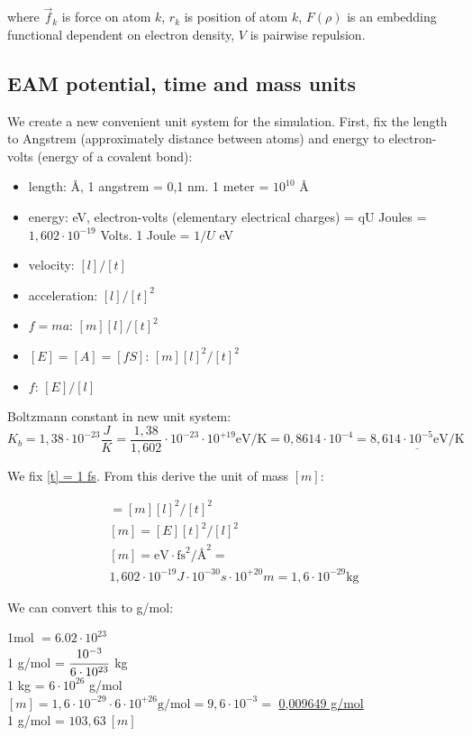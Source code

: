 \documentclass[12pt,a4paper]{article}
\newcommand{\mat}[1]{\vec{#1}}
\begin{document}
where $\mat{f}_k$ is force on atom $k$, $r_k$ is position of atom $k$, $F(\rho)$ is an embedding functional dependent on electron density, $V$ is pairwise repulsion.

\subsection*{EAM potential, time and mass units}

We create a new convenient unit system for the simulation. First, fix the length to Angstrem (approximately distance between atoms) and energy to electron-volts (energy of a covalent bond):

\begin{itemize}
	\item length: Å, 1 angstrem = 0,1 nm. 1 meter = $10^{10}$ Å
	\item energy: eV, electron-volts (elementary electrical charges) = qU Joules = $1,602 \cdot 10^{-19}$ Volts. 1 Joule = $1/U$ eV
	\item velocity: $[l]/[t]$
	\item acceleration: $[l]/[t]^2$
	\item $f=ma$:       $[m][l]/[t]^2$
	\item $[E]=[A]=[fS]$:    $[m][l]^2/[t]^2$
	\item $f$: $[E]/[l]$
\end{itemize}

Boltzmann constant in new unit system: \[ K_b = 1,38 \cdot 10^{-23} \frac{J}{K} = \frac{1,38}{1,602} \cdot 10^{-23} \cdot 10^{+19} \text{eV/K} = 0,8614 \cdot 10^{-4} = \underline{8,614 \cdot 10^{-5} \text{eV/K}} \]

We fix \underline{[t] = 1 fs}. From this derive the unit of mass $[m]$: 

\begin{gather*}
	[E] = [m][l]^2/[t]^2\\
	[m] = [E][t]^2/[l]^2\\
	[m] = \text{eV} \cdot \text{fs}^2 / \text{Å}^2 =\\
	1,602 \cdot 10^{-19} J \cdot 10^{-30} s \cdot 10^{+20} m = 1,6 \cdot 10^{-29} \text{kg}
\end{gather*}

We can convert this to g/mol:
\begin{center}
	1mol $= 6.02 \cdot 10^{23}$\\
	1 g/mol = $\cfrac{10^{-3}}{6 \cdot 10^{23}}$ kg\\
	1 kg = $6 \cdot 10^{26}$ g/mol\\
	$[m] = 1,6 \cdot 10^{-29} \cdot 6 \cdot 10^{+26} \text{g/mol} = 9,6 \cdot 10^{-3} =$ \underline{0,009649 g/mol}\\
	1 g/mol = $103,63\ [m]$
\end{center}
\end{document}
